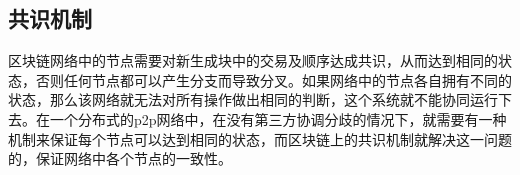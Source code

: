 












\subsection{共识机制}

区块链网络中的节点需要对新生成块中的交易及顺序达成共识，从而达到相同的状态，否则任何节点都可以产生分支而导致分叉。如果网络中的节点各自拥有不同的状态，那么该网络就无法对所有操作做出相同的判断，这个系统就不能协同运行下去。在一个分布式的p2p网络中，在没有第三方协调分歧的情况下，就需要有一种机制来保证每个节点可以达到相同的状态，而区块链上的共识机制就解决这一问题的，保证网络中各个节点的一致性。

